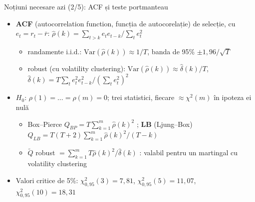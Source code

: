 \begin{frame}{Noțiuni necesare azi (2/5): ACF și teste portmanteau}
\itemsize{\small}
\begin{itemize}
    \item \textbf{ACF} (autocorrelation function, funcția de autocorelație) de selecție, cu $e_t = r_t - \bar r$: $\hat\rho(k) = \sum_{t>k} e_te_{t-k}\big/\sum_t e_t^2$
    \begin{itemize}
        \item randamente i.i.d.: $\mathrm{Var}(\hat\rho(k)) \approx 1/T$, banda de 95\% $\pm 1{,}96/\sqrt{T}$
        \item robust (cu volatility clustering): $\mathrm{Var}(\hat\rho(k)) \approx \hat\delta(k)/T$, $\hat\delta(k) = T\sum_t e_t^2e_{t-k}^2/(\sum_t e_t^2)^2$ 
    \end{itemize}
    \item $H_0$: $\rho(1) = \dots = \rho(m) = 0$; trei statistici, fiecare $\approx \chi^2(m)$ în ipoteza ei nulă
    \begin{itemize}
        \item Box--Pierce $Q_{BP} = T\sum_{k=1}^m \hat\rho(k)^2$ ; \textbf{LB} (Ljung--Box) $Q_{LB} = T(T+2)\sum_{k=1}^m \hat\rho(k)^2/(T-k)$ 
        \item $\tilde Q$ robust $= \sum_{k=1}^m T\hat\rho(k)^2/\hat\delta(k)$ : valabil pentru un martingal cu volatility clustering
    \end{itemize}
    \item Valori critice de 5\%: $\chi^2_{0{,}95}(3) = 7{,}81$, $\chi^2_{0{,}95}(5) = 11{,}07$, $\chi^2_{0{,}95}(10) = 18{,}31$
\end{itemize}
\end{frame}


